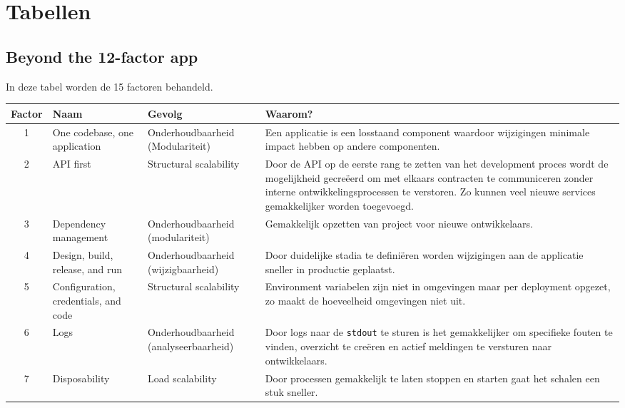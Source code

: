 
\chapter{Tabellen} %

\label{BijlageTabellen} 

\section{Beyond the 12-factor app}

\label{TabelFactors}

In deze tabel worden de 15 factoren behandeld.

\begin{longtable}[c]{c p{3cm} p{3.5cm} p{5.5cm}}
	\toprule
	\textbf{Factor} & \textbf{Naam} & \textbf{Gevolg} & \textbf{Waarom?} \\
	\midrule		
	1 & One codebase, one application & Onderhoudbaarheid (Modulariteit) & Een applicatie is een losstaand component waardoor wijzigingen minimale impact hebben op andere componenten. \\
	2 & API first & Structural scalability & Door de API op de eerste rang te zetten van het development proces wordt de mogelijkheid gecreëerd om met elkaars contracten te communiceren zonder interne ontwikkelingsprocessen te verstoren. Zo kunnen veel nieuwe services gemakkelijker worden toegevoegd. \\
	3 & Dependency management & Onderhoudbaarheid (modulariteit) & Gemakkelijk opzetten van project voor nieuwe ontwikkelaars. \\
	4 & Design, build, release, and run & Onderhoudbaarheid (wijzigbaarheid) & Door duidelijke stadia te definiëren worden wijzigingen aan de applicatie sneller in productie geplaatst. \\
	5 & Configuration, credentials, and code & Structural scalability & Environment variabelen zijn niet in omgevingen maar per deployment opgezet, zo maakt de hoeveelheid omgevingen niet uit. \\
	6 & Logs & Onderhoudbaarheid (analyseerbaarheid) & Door logs naar de \texttt{stdout} te sturen is het gemakkelijker om specifieke fouten te vinden, overzicht te creëren en actief meldingen te versturen naar ontwikkelaars. \\
	7 & Disposability & Load scalability & Door processen gemakkelijk te laten stoppen en starten gaat het schalen een stuk sneller. \\

\end{longtable}

